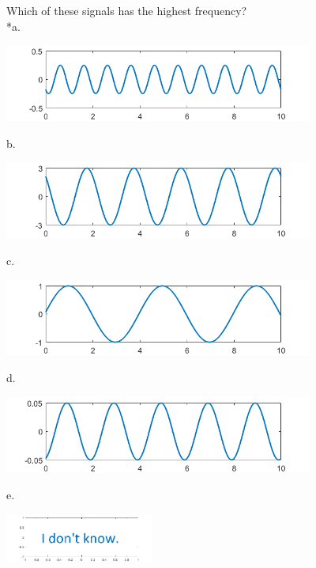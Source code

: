 
Which of these signals has the highest frequency?\\

*a.

\includegraphics[width=4in,height=1in]{../../Images/FrequencyDomainQ3a.png}

b. 

\includegraphics[width=4in,height=1in]{../../Images/FrequencyDomainQ3b.png}

c. 

\includegraphics[width=4in,height=1in]{../../Images/FrequencyDomainQ3c.png}

d. 

\includegraphics[width=4in,height=1in]{../../Images/FrequencyDomainQ3d.png}

e. 

\includegraphics[width=1.92042in,height=0.62319in]{../../Images/AnswerEGraph.png}\\
